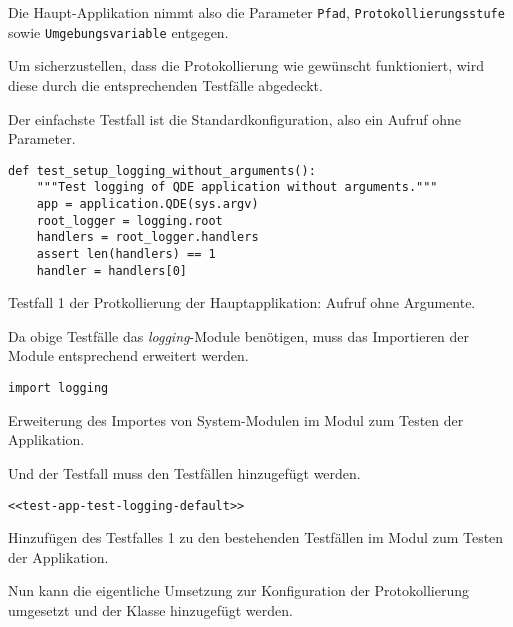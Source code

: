 \documentclass[10pt, openright, notitlepage]{scrreprt}
\begin{document}
Die Haupt-Applikation nimmt also die Parameter \texttt{Pfad}, \texttt{Protokollierungsstufe}
sowie \texttt{Umgebungsvariable} entgegen.

Um sicherzustellen, dass die Protokollierung wie gewünscht funktioniert, wird
diese durch die entsprechenden Testfälle abgedeckt.

Der einfachste Testfall ist die Standardkonfiguration, also ein Aufruf ohne
Parameter.

\begin{listing}[H]
\begin{verbatim}
def test_setup_logging_without_arguments():
    """Test logging of QDE application without arguments."""
    app = application.QDE(sys.argv)
    root_logger = logging.root
    handlers = root_logger.handlers
    assert len(handlers) == 1
    handler = handlers[0]
\end{verbatim}
\caption{\label{orgf9e80f4}
Testfall 1 der Protkollierung der Hauptapplikation: Aufruf ohne Argumente.}
\end{listing}

Da obige Testfälle das \emph{logging}-Module benötigen, muss das Importieren der Module
entsprechend erweitert werden.

\begin{listing}[H]
\begin{verbatim}
import logging
\end{verbatim}
\caption{\label{orgd8c9d30}
Erweiterung des Importes von System-Modulen im Modul zum Testen der Applikation.}
\end{listing}

Und der Testfall muss den Testfällen hinzugefügt werden.

\begin{listing}[H]
\begin{verbatim}
<<test-app-test-logging-default>>
\end{verbatim}
\caption{\label{org50588ff}
Hinzufügen des Testfalles 1 zu den bestehenden Testfällen im Modul zum Testen der Applikation.}
\end{listing}

Nun kann die eigentliche Umsetzung zur Konfiguration der Protokollierung
umgesetzt und der Klasse hinzugefügt werden.
\end{document}
